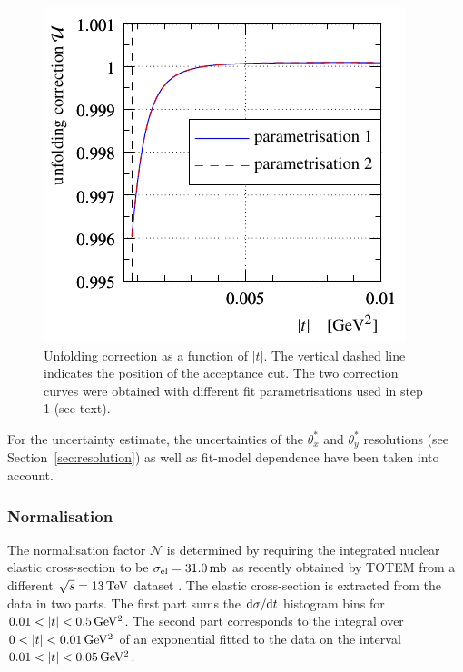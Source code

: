 \begin{figure}
\begin{center}
\includegraphics{fig/unfolding_num_int_model_cmp.pdf}
\caption{%
Unfolding correction as a function of $|t|$. The vertical dashed line indicates the position of the acceptance cut. The two correction curves were obtained with different fit parametrisations used in step 1 (see text).
}
\label{fig:unfolding}
\end{center}
\end{figure}

For the uncertainty estimate, the uncertainties of the $\theta_x^*$ and $\theta_y^*$ resolutions (see Section~\ref{sec:resolution}) as well as fit-model dependence have been taken into account.




\subsubsection{Normalisation}
\label{sec:normalisation}

The normalisation factor $\mathcal{N}$ is determined by requiring the integrated nuclear elastic cross-section to be $\sigma_{\rm el} = 31.0\,{\rm mb}$ as recently obtained by TOTEM from a different $\sqrt s = 13\,{\rm TeV}$ dataset \cite{totem-13tev-90m}. The elastic cross-section is extracted from the data in two parts. The first part sums the ${\rm d}\sigma/{\rm d} t$ histogram bins for $0.01 < |t| < 0.5\,{\rm GeV^2}$. The second part corresponds to the integral over $0 < |t| < 0.01\,{\rm GeV^2}$ of an exponential fitted to the data on the interval $0.01 < |t| < 0.05\,{\rm GeV^2}$.

